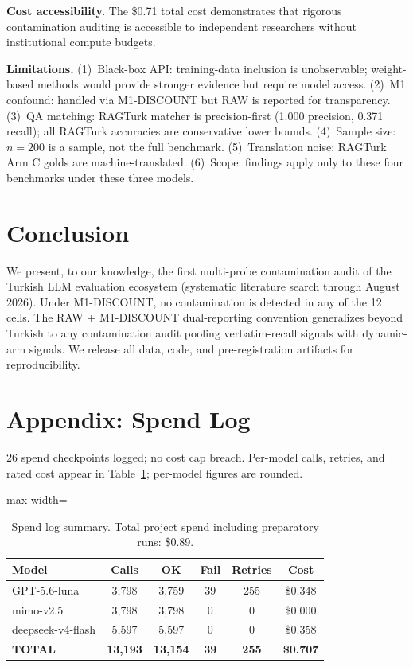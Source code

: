 \documentclass[letterpaper]{article}
\begin{document}
\textbf{Cost accessibility.} The \$0.71 total cost demonstrates that rigorous contamination auditing is accessible to independent researchers without institutional compute budgets.

\textbf{Limitations.} (1)~Black-box API: training-data inclusion is unobservable; weight-based methods would provide stronger evidence but require model access. (2)~M1 confound: handled via M1-DISCOUNT but RAW is reported for transparency. (3)~QA matching: RAGTurk matcher is precision-first (1.000 precision, 0.371 recall); all RAGTurk accuracies are conservative lower bounds. (4)~Sample size: $n=200$ is a sample, not the full benchmark. (5)~Translation noise: RAGTurk Arm C golds are machine-translated. (6)~Scope: findings apply only to these four benchmarks under these three models.

\section{Conclusion}
We present, to our knowledge, the first multi-probe contamination audit of the Turkish LLM evaluation ecosystem (systematic literature search through August 2026). Under M1-DISCOUNT, no contamination is detected in any of the 12 cells. The RAW + M1-DISCOUNT dual-reporting convention generalizes beyond Turkish to any contamination audit pooling verbatim-recall signals with dynamic-arm signals. We release all data, code, and pre-registration artifacts for reproducibility.

\section*{Appendix: Spend Log}

26 spend checkpoints logged; no cost cap breach. Per-model calls, retries, and rated cost appear in Table~\ref{tab:spend}; per-model figures are rounded.

\begin{table}[t]
\centering
\begin{adjustbox}{max width=\textwidth}
\begin{tabular}{lccccc}
\toprule
\textbf{Model} & \textbf{Calls} & \textbf{OK} & \textbf{Fail} & \textbf{Retries} & \textbf{Cost} \\
\midrule
GPT-5.6-luna & 3,798 & 3,759 & 39 & 255 & \$0.348 \\
mimo-v2.5 & 3,798 & 3,798 & 0 & 0 & \$0.000 \\
deepseek-v4-flash & 5,597 & 5,597 & 0 & 0 & \$0.358 \\
\midrule
\textbf{TOTAL} & \textbf{13,193} & \textbf{13,154} & \textbf{39} & \textbf{255} & \textbf{\$0.707} \\
\bottomrule
\end{tabular}%
\end{adjustbox}
\caption{Spend log summary. Total project spend including preparatory runs: \$0.89.}
\label{tab:spend}
\end{table}

\clearpage


\end{document}
